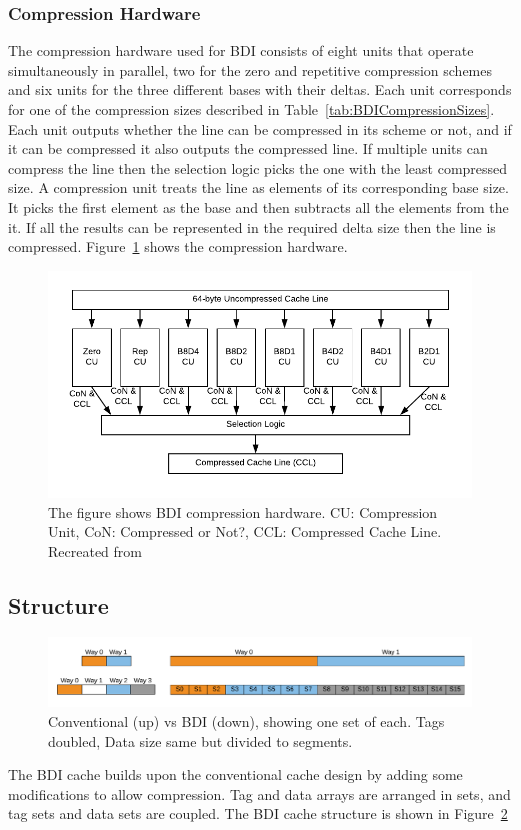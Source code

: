 \subsubsection{Compression Hardware}
\label{sssec:BDICompressionHardware}
The compression hardware used for BDI consists of eight units that operate simultaneously in parallel, two for the zero and repetitive compression schemes and six units for the three different bases with their deltas. Each unit corresponds for one of the compression sizes described in Table~\ref{tab:BDICompressionSizes}. Each unit outputs whether the line can be compressed in its scheme or not, and if it can be compressed it also outputs the compressed line. If multiple units can compress the line then the selection logic picks the one with the least compressed size.
A compression unit treats the line as elements of its corresponding base size. It picks the first element as the base and then subtracts all the elements from the it. If all the results can be represented in the required delta size then the line is compressed. Figure~\ref{fig:BDIHardware} shows the compression hardware.
\begin{figure}
    \includegraphics[width=\textwidth]{BDIHardware.pdf}
    \caption[BDI Compression Hardware]{The figure shows BDI compression hardware. CU: Compression Unit, CoN: Compressed or Not?, CCL: Compressed Cache Line. Recreated from \protect\cite{bdi}}
    \label{fig:BDIHardware}
\end{figure}

\subsection{Structure}
\label{ssec:BDIStructure}
\begin{figure}
    \includegraphics[width=\textwidth]{BDI.pdf}
    \caption[BDI Cache]{Conventional (up) vs BDI (down), showing one set of each. Tags doubled, Data size same but divided to segments.}
    \label{fig:BDI}
\end{figure}
The BDI cache builds upon the conventional cache design by adding some modifications to allow compression. Tag and data arrays are arranged in sets, and tag sets and data sets are coupled. The BDI cache structure is shown in Figure~\ref{fig:BDI}
